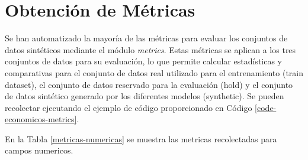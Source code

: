 \section{Obtención de Métricas}
\label{subsec:metricas}

Se han automatizado la mayoría de las métricas para evaluar los conjuntos de datos sintéticos mediante el módulo \emph{metrics}. Estas métricas se aplican a los tres conjuntos de datos para su evaluación, lo que permite calcular estadísticas y comparativas para el conjunto de datos real utilizado para el entrenamiento (train dataset), el conjunto de datos reservado para la evaluación (hold) y el conjunto de datos sintético generado por los diferentes modelos (synthetic). Se pueden recolectar ejecutando el ejemplo de código proporcionado en Código \ref{code-economicos-metrics}.


En la Tabla \ref{metricas-numericas} se muestra las metricas recolectadas para campos numericos.

